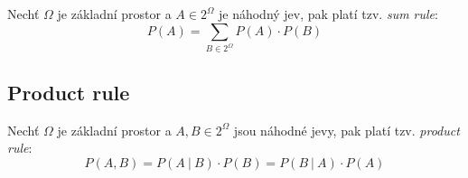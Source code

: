 \begin{compactitem}
    \item Nechť $\Omega$ je základní prostor a $A \in 2^{\Omega}$ je náhodný jev, pak platí tzv. \textit{sum rule}:
    $$ P(A) = \sum_{B \in 2^{\Omega}} P(A) \cdot P(B)$$
\end{compactitem}

\subsection{Product rule}

\begin{compactitem}
    \item Nechť $\Omega$ je základní prostor a $A, B \in 2^{\Omega}$ jsou náhodné jevy, pak platí tzv. \textit{product rule}:
    $$ P(A, B) = P(A ~|~ B) \cdot P(B) = P(B ~|~ A) \cdot P(A) $$
\end{compactitem}
